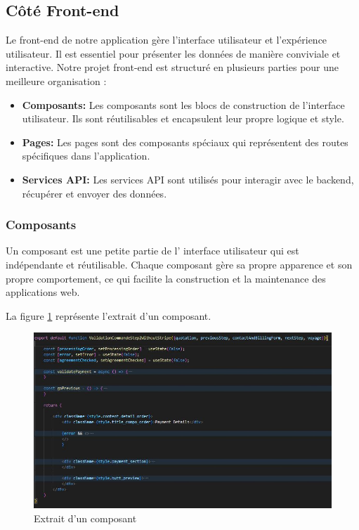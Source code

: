 \documentclass[12pt]{report}
\begin{document}
			\subsection{Côté Front-end}

			\hspace{15pt} Le front-end de notre application gère l'interface utilisateur et l'expérience utilisateur. Il est essentiel pour présenter les données de manière conviviale et interactive. Notre projet front-end est structuré en plusieurs parties pour une meilleure organisation :

			\begin{itemize}
				\item \textbf{Composants:} Les composants sont les blocs de construction de l'interface utilisateur. Ils sont réutilisables et encapsulent leur propre logique et style.
				\item  \textbf{Pages:} Les pages sont des composants spéciaux qui représentent des routes spécifiques dans l'application.
				\item \textbf{Services API:} Les services API sont utilisés pour interagir avec le backend, récupérer et envoyer des données.
			\end{itemize}

			\subsubsection{Composants}
			\hspace{15pt} Un composant est une petite partie de l' interface utilisateur qui est indépendante et réutilisable. Chaque composant gère sa propre apparence et son propre comportement, ce qui facilite la construction et la maintenance des applications web.

			La figure \ref{fig:component} représente l'extrait d'un composant.
			
			\begin{figure}[h]
				\centering
				\includegraphics[width=\textwidth]{component.jpg}
				\caption{Extrait d'un composant}
				\label{fig:component}
			\end{figure}
			\FloatBarrier
			
\end{document}
